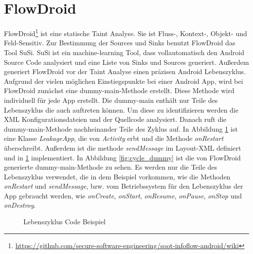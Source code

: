 \documentclass[runningheads]{llncs}
\begin{document}
\section{FlowDroid}\label{sec:flowdroid}
FlowDroid\footnote{\url{https://github.com/secure-software-engineering/soot-infoflow-android/wiki}} ist eine statische Taint Analyse. Sie ist Fluss-, Kontext-, Objekt- und Feld-Sensitiv. Zur Bestimmung der Sources und Sinks benutzt FlowDroid das Tool SuSi. SuSi ist ein machine-learning Tool, dass vollautomatisch den Android Source Code analysiert und eine Liste von Sinks und Sources generiert. Außerdem generiert FlowDroid vor der Taint Analyse einen präzisen Android Lebenszyklus.\\
Aufgrund der vielen möglichen Einstiegspunkte bei einer Android App, wird bei FlowDroid zunächst eine dummy-main-Methode erstellt. Diese Methode wird individuell für jede App erstellt. Die dummy-main enthält nur Teile des Lebenszyklus die auch auftreten können. Um diese zu identifizieren werden die XML Konfigurationsdateien und der Quellcode analysiert. Danach ruft die dummy-main-Methode nachheinander Teile des Zyklus auf. 
In Abbildung \ref{fig:cycle_code} ist eine Klasse \emph{LeakageApp}, die von \emph{Activity} erbt und die Methode \emph{onRestart} überschreibt. Außerdem ist die methode \emph{sendMessage} im Layout-XML definiert und in \ref{fig:cycle_code} implementiert. In Abbildung \ref{fig:cycle_dummy} ist die von FlowDroid generierte dummy-main-Methode zu sehen. Es werden nur die Teile des Lebenszyklus verwendet, die in dem Beispiel vorkommen, wie die Methoden \emph{onRestart} und \emph{sendMessage}, bzw. vom Betriebssystem für den Lebenszyklus der App gebraucht werden, wie \emph{onCreate}, \emph{onStart}, \emph{onResume}, \emph{onPause}, \emph{onStop} und \emph{onDestroy}.
\begin{figure}

\caption{Lebenszyklus Code Beispiel}
\label{fig:cycle_code}
\end{figure}
\end{document}
